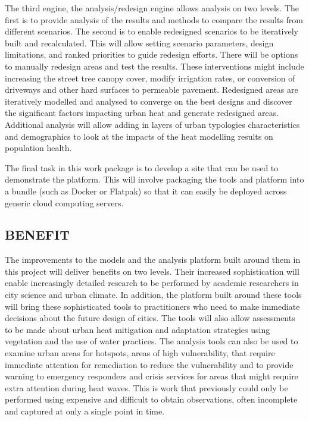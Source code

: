 The third engine, the analysis/redesign engine allows analysis on two levels. The first is to provide analysis of the results and methods to compare the results from different scenarios. The second is to enable redesigned scenarios to be iteratively built and recalculated. This will allow setting scenario parameters, design limitations, and ranked priorities to guide redesign efforts. There will be options to manually redesign areas and test the results. These interventions might include increasing the street tree canopy cover, modify irrigation rates, or  conversion of driveways and other hard surfaces to permeable pavement. Redesigned areas are iteratively modelled and analysed to converge on the best designs and discover the significant factors impacting urban heat and generate redesigned areas. Additional analysis will allow adding in layers of urban typologies characteristics and demographics to look at the impacts of the heat modelling results on population health.
 
The final task in this work package is to develop a site that can be used to demonstrate the platform. This will involve packaging the tools and platform into a bundle (such as Docker or Flatpak) so that it can easily be deployed across generic cloud computing servers.







\subsection*{\TitleFont BENEFIT}



The improvements to the models and the analysis platform built around them in this project will deliver benefits on two levels. Their increased sophistication will enable increasingly detailed research to be performed by academic researchers in city science and urban climate. In addition, the platform built around these tools will bring these sophisticated tools to practitioners who need to make immediate decisions about the future design of cities. The tools will also allow assessments to be made about urban heat mitigation and adaptation strategies using vegetation and the use of water practices. The analysis tools can also be used to examine urban areas for hotspots, areas of high vulnerability, that require immediate attention for remediation to reduce the vulnerability and to provide warning to emergency responders and crisis services for areas that might require extra attention during heat waves. This is work that previously could only be performed using expensive and difficult to obtain observations, often incomplete and captured at only a single point in time.

